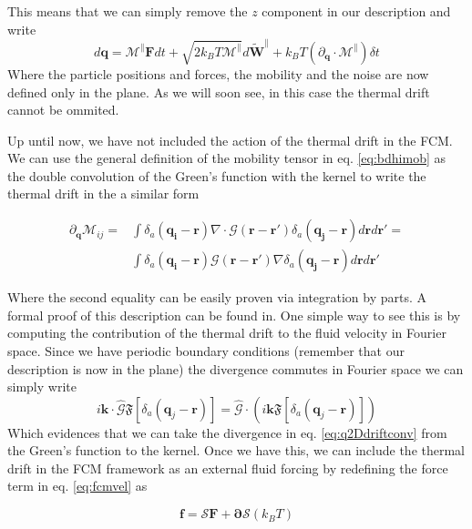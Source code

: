 \documentclass[ twoside,openright,titlepage,numbers=noenddot,%
headinclude,footinclude,cleardoublepage=empty,abstract=on,
BCOR=5mm,paper=a4,fontsize=11pt, dvipsnames
]{scrreprt}
\renewcommand{\vec}[1]{\bm{#1}}
\newcommand{\tens}[1]{\bm{\mathcal{#1}}}
\newcommand{\oper}[1]{\mathcal{#1}}
\newcommand{\dt}{\delta t}
\newcommand{\kT}{k_B T}
\newcommand{\fou}[1]{\widehat{#1}}
\newcommand{\ppos}{q}
\begin{document}
This means that we can simply remove the $z$ component in our description and write
\begin{equation}
  d\vec{\ppos} = \tens{M}^{\parallel}\vec{F}dt + \sqrt{2\kT \tens{M}^{\parallel}}d\vec{\widetilde{W}^{\parallel}} + \kT\left(\partial_{\vec{\ppos}}\cdot\tens{M}^{\parallel}\right)\dt
\end{equation}
Where the particle positions and forces, the mobility and the noise are now defined only in the plane.
As we will soon see, in this case the thermal drift cannot be ommited.

Up until now, we have not included the action of the thermal drift in the \gls{FCM}. We can use the general definition of the mobility tensor in eq. \eqref{eq:bdhimob} as the double convolution of the Green's function with the kernel to write the thermal drift in the a similar form

\begin{equation}
  \label{eq:q2Ddriftconv}
  \begin{aligned}
    \partial_{\vec{\ppos}}\tens{M}_{ij}=& \int\delta_a(\vec{\ppos_i} -\vec{r})\nabla\cdot\tens{G}(\vec{r}-\vec{r}')\delta_a(\vec{\ppos_j} -\vec{r})d\vec{r}d\vec{r}' =\\
     &\int\delta_a(\vec{\ppos_i} -\vec{r})\tens{G}(\vec{r}-\vec{r}')\nabla\delta_a(\vec{\ppos_j} -\vec{r})d\vec{r}d\vec{r}'    
\end{aligned}
\end{equation}

Where the second equality can be easily proven via integration by parts. A formal proof of this description can be found in\cite{Donev2014}. One simple way to see this is by computing the contribution of the thermal drift to the fluid velocity in Fourier space. Since we have periodic boundary conditions (remember that our description is now in the plane) the divergence commutes in Fourier space we can simply write
\begin{equation}
  i\vec{k}\cdot\fou{\tens{G}}\mathfrak{F}\left[\delta_a(\vec{\ppos}_j -\vec{r})\right] = \fou{\tens{G}}\cdot \left(i\vec{k}\mathfrak{F}\left[\delta_a(\vec{\ppos}_j -\vec{r})\right]\right)
\end{equation}
Which evidences that we can take the divergence in eq. \eqref{eq:q2Ddriftconv} from the Green's function to the kernel.
Once we have this, we can include the thermal drift in the \gls{FCM} framework as an external fluid forcing by redefining the force term in eq. \eqref{eq:fcmvel} as

\begin{equation}
  \label{eq:q2Ddrifasforce}
  \vec{f} = \oper{S}\vec{F} + \vec{\partial}\oper{S}(\kT)
\end{equation}
\end{document}
